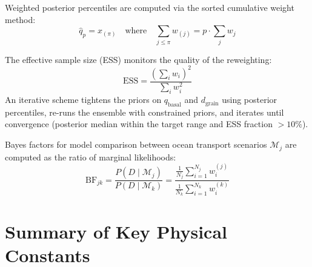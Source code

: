 \documentclass[11pt,a4paper]{article}
\begin{document}
Weighted posterior percentiles are computed via the sorted cumulative
weight method:
\begin{equation}
\hat{q}_p = x_{(\pi)}
\quad\text{where}\quad
\sum_{j \leq \pi} w_{(j)} = p \cdot \sum_j w_j
\end{equation}

The effective sample size (ESS) monitors the quality of the
reweighting:
\begin{equation}
\mathrm{ESS} = \frac{\left(\sum_i w_i\right)^2}{\sum_i w_i^2}
\label{eq:ess}
\end{equation}
An iterative scheme tightens the priors on $q_{\mathrm{basal}}$ and
$d_{\mathrm{grain}}$ using posterior percentiles, re-runs the ensemble
with constrained priors, and iterates until convergence (posterior
median within the target range and ESS fraction $> 10\%$).

Bayes factors for model comparison between ocean transport scenarios
$\mathcal{M}_j$ are computed as the ratio of marginal likelihoods:
\begin{equation}
\mathrm{BF}_{jk}
  = \frac{P(D \mid \mathcal{M}_j)}{P(D \mid \mathcal{M}_k)}
  = \frac{\frac{1}{N_j}\sum_{i=1}^{N_j} w_i^{(j)}}
         {\frac{1}{N_k}\sum_{i=1}^{N_k} w_i^{(k)}}
\label{eq:bayes_factor}
\end{equation}

\section{Summary of Key Physical Constants}
\label{sec:constants}
\end{document}
